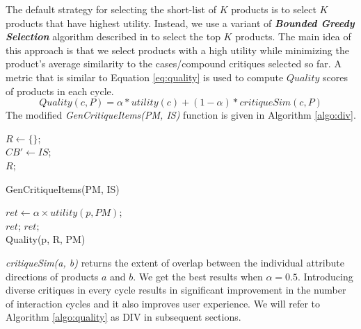 The default strategy for selecting the short-list of $K$ products is to select $K$ products that have highest utility.
Instead, we use a variant of \textit{\textbf{Bounded Greedy Selection}} algorithm described in \cite{boundedGreedy} to select the top $K$ products.
The main idea of this approach is that we select products with a high utility while minimizing the product's average similarity to the cases/compound critiques selected so far.
A metric that is similar to Equation \ref{eq:quality} is used to compute $Quality$ scores of products in each cycle.
\begin{equation}
\label{eq:quality}
Quality(c, P) = \alpha * utility(c) + (1-\alpha)*critiqueSim(c, P)
\end{equation}
%
The modified \textit{GenCritiqueItems(PM, IS)} function is given in Algorithm \ref{algo:div}.
\begin{algorithm}[ht]
  \DontPrintSemicolon

  $R \gets \{\}$;\\
  $CB' \gets IS$;\\
  \Return $R;$
  \caption{GenCritiqueItems(PM, IS)}
  \label{algo:div}
\end{algorithm}

\begin{algorithm}[ht]
  \DontPrintSemicolon

  $ret \gets \alpha \times utility(p, PM)$; \\
   {\Return $ret$;}
  \Return $ret;$\\
  \caption{Quality(p, R, PM)}
  \label{algo:quality}
\end{algorithm}

\textit{critiqueSim(a, b)} returns the extent of overlap between the individual attribute directions of products $a$ and $b$.
We get the best results when $\alpha = 0.5$.
Introducing diverse critiques in every cycle results in significant improvement in the number of interaction cycles and it also improves user experience.
We will refer to Algorithm \ref{algo:quality} as DIV in subsequent sections.



